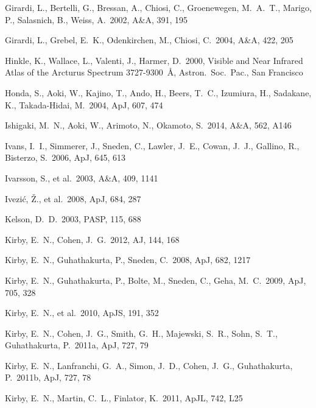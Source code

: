 \documentclass[useAMS,usenatbib,usegraphicx]{mn2e}
\def\apj{ApJ}
\def\aap{A\&A}
\def\aj{AJ}
\def\apjs{ApJS}
\def\apjl{ApJL}
\def\pasp{PASP}
\begin{document}
\begin{thebibliography}{}
 Girardi, L., Bertelli, G., 
Bressan, A., Chiosi, C., Groenewegen, M.~A.~T., Marigo, P., 
Salasnich, B., Weiss, A.\ 2002, \aap, 391, 195 

 Girardi, L., Grebel, E.~K., 
Odenkirchen, M., Chiosi, C.\ 2004, \aap, 422, 205 

 Hinkle, K., Wallace, L.,
Valenti, J., Harmer, D.\ 2000, Visible and Near Infrared Atlas of the
Arcturus Spectrum 3727-9300~\AA, Astron.\ Soc.\ Pac., San Francisco

 Honda, S., Aoki, W., 
Kajino, T., Ando, H., Beers, T.~C., Izumiura, H., 
Sadakane, K., Takada-Hidai, M.\ 2004, \apj, 607, 474 

 Ishigaki, M.~N., Aoki, W., 
Arimoto, N., Okamoto, S.\ 2014, \aap, 562, A146

 Ivans, I.~I., Simmerer, 
J., Sneden, C., Lawler, J.~E., Cowan, J.~J., Gallino, R., 
Bisterzo, S.\ 2006, \apj, 645, 613 

 Ivarsson, S., 
et al.\ 2003, \aap, 409, 1141 

 Ivezi{\'c}, {\v Z}.,
et al.\ 2008, \apj, 684, 287 

 Kelson, D.~D.\ 2003, \pasp, 115, 688 

 Kirby, E.~N., Cohen, J.~G.\ 
2012, \aj, 144, 168 

 Kirby, E.~N., 
Guhathakurta, P., Sneden, C.\ 2008, \apj, 682, 1217 

 Kirby, E.~N., 
Guhathakurta, P., Bolte, M., Sneden, C., Geha, M.~C.\ 2009, \apj, 705, 328

 Kirby, E.~N., 
et al.\ 2010, \apjs, 191, 352

 Kirby, E.~N., Cohen, 
J.~G., Smith, G.~H., Majewski, S.~R., Sohn, S.~T., Guhathakurta, P.\ 
2011a, \apj, 727, 79 

 Kirby, E.~N., Lanfranchi, 
G.~A., Simon, J.~D., Cohen, J.~G., Guhathakurta, P.\ 2011b, \apj, 727, 78 

\bibitem[Kirby, Martin, \& Finlator(2011)]{kirby11c} Kirby, E.~N., Martin, 
C.~L., Finlator, K.\ 2011, \apjl, 742, L25 


\end{thebibliography}
\end{document}
